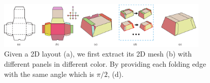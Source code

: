 \begin{figure}
	\centering
	\includegraphics[width=0.9\textwidth]{images/overview}
	\caption{Given a 2D layout (a), we first extract its 2D mesh (b) with different panels in different color. By providing each folding edge with the same angle which is $\pi/2$,  (d).}
	\label{fig:overview}
\end{figure} 
 

